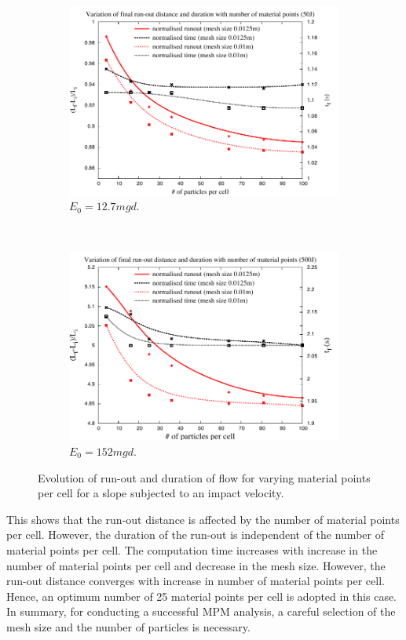 \begin{figure}[tbhp]
\centering
\begin{subfigure}[b]{0.95\textwidth}
\includegraphics[width=\textwidth]{50}
\caption{$E_0=12.7mgd$.}
\label{fig:50}
\end{subfigure}
\\
\begin{subfigure}[b]{0.95\textwidth}
\centering
\includegraphics[width=\textwidth]{500}
\caption{$E_0=152mgd$.}
\label{fig:500}
\end{subfigure}
\caption{Evolution of run-out and duration of flow  for varying material points 
per cell for a slope subjected to an impact velocity.}
\label{fig:MPM_Size_Effect}
\end{figure}

This shows that the run-out distance is affected by the number of material 
points per cell. However, the duration of the run-out is independent of the 
number of material points per cell. The computation time increases with 
increase in the number of material points per cell and decrease in the mesh 
size. However, the run-out distance converges with increase in number of 
material points per cell. Hence, an optimum number of 25 material points per 
cell is adopted in this case. In summary, for conducting a successful MPM 
analysis, a careful selection of the mesh size and the number of particles is 
necessary.

